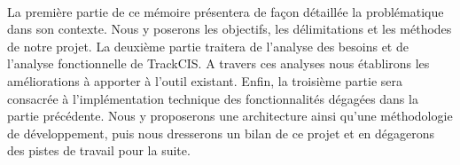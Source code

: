 	\paragraph{}
	La première partie de ce mémoire présentera de façon détaillée la problématique
	dans son contexte. Nous y poserons les objectifs, les délimitations et les
	méthodes de notre projet.\newline
	La deuxième partie traitera de l'analyse des besoins et de
	l'analyse fonctionnelle de TrackCIS. A travers ces analyses nous établirons les
	améliorations à apporter à l'outil existant.\newline
	Enfin, la troisième partie sera consacrée à l'implémentation technique des
	fonctionnalités dégagées dans la partie précédente. Nous y proposerons une
	architecture ainsi qu'une méthodologie de développement, puis nous dresserons
	un bilan de ce projet et en dégagerons des pistes de travail pour la suite.
